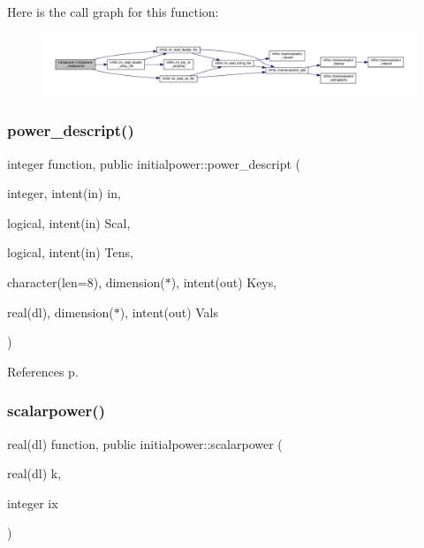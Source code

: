 Here is the call graph for this function\+:
\nopagebreak
\begin{figure}[H]
\begin{center}
\leavevmode
\includegraphics[width=350pt]{namespaceinitialpower_aad1ed45315709769eb35a28cbc8731f1_cgraph}
\end{center}
\end{figure}
\mbox{\label{namespaceinitialpower_a44d725f2b2b68cb9ea810423c9b4d8c4}} 
\subsubsection{\texorpdfstring{power\+\_\+descript()}{power\_descript()}}
{\footnotesize\ttfamily integer function, public initialpower\+::power\+\_\+descript (\begin{DoxyParamCaption}\item[{integer, intent(in)}]{in,  }\item[{logical, intent(in)}]{Scal,  }\item[{logical, intent(in)}]{Tens,  }\item[{character(len=8), dimension($\ast$), intent(out)}]{Keys,  }\item[{real(dl), dimension($\ast$), intent(out)}]{Vals }\end{DoxyParamCaption})}



References p.

\mbox{\label{namespaceinitialpower_a2263ec918226f30880a9efbedf684be8}} 
\subsubsection{\texorpdfstring{scalarpower()}{scalarpower()}}
{\footnotesize\ttfamily real(dl) function, public initialpower\+::scalarpower (\begin{DoxyParamCaption}\item[{real(dl)}]{k,  }\item[{integer}]{ix }\end{DoxyParamCaption})}



